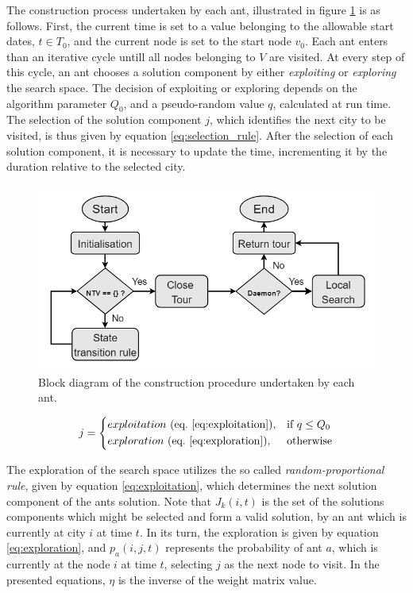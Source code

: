 The construction process undertaken by each ant, illustrated in figure
\ref{fig:aco_construction} is as follows. First, the current time is set to a
value belonging to the allowable start dates, $t \in T_0$, and the current node
is set to the start node $v_0$. Each ant enters than an iterative cycle untill
all nodes belonging to $V$ are visited. At every step of this cycle, an ant
chooses a solution component by either \textit{exploiting} or \textit{exploring}
the search space. The decision of exploiting or exploring depends on the
algorithm parameter $Q_0$, and a pseudo-random value $q$, calculated at run
time. The selection of the solution component $j$, which identifies the next
city to be visited, is thus given by equation \ref{eq:selection_rule}. After the
selection of each solution component, it is necessary to update the time,
incrementing it by the duration relative to the selected city.

\begin{figure}[htpb]
  \centering
  \includegraphics[width=\textwidth]{./Figures/system_implementation/aco_construction.png}
  \caption{Block diagram of the construction procedure undertaken by each ant.}
  \label{fig:aco_construction}  
\end{figure}

\begin{equation}
  \label{eq:selection_rule}
  j =  \left \{
    \begin{aligned}
      & exploitation \ (\text{eq.} \ \ref{eq:exploitation}) , && \text{if}\ q \leq Q_0 \\
      & exploration \ (\text{eq.} \ \ref{eq:exploration}), && \text{otherwise}
    \end{aligned} \right. 
\end{equation}

The exploration of the search space utilizes the so called
\textit{random-proportional rule}, given by equation \ref{eq:exploitation},
which determines the next solution component of the ants solution. Note that
$J_k(i,t)$ is the set of the solutions components which might be selected and
form a valid solution, by an ant which is currently at city $i$ at time $t$. In
its turn, the exploration is given by equation \ref{eq:exploration}, and
$p_a(i,j,t)$ represents the probability of ant $a$, which is currently at the
node $i$ at time $t$, selecting $j$ as the next node to visit. In the presented
equations, $\eta$ is the inverse of the weight matrix value.

